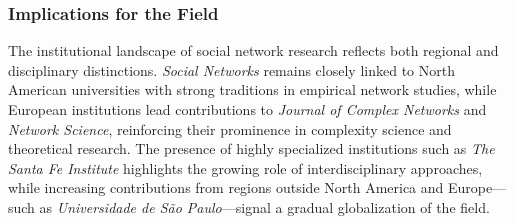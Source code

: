 \documentclass[twocolumn]{article}
\begin{document}
	\subsubsection*{Implications for the Field}
	
	The institutional landscape of social network research reflects both regional and disciplinary distinctions. \textit{Social Networks} remains closely linked to North American universities with strong traditions in empirical network studies, while European institutions lead contributions to \textit{Journal of Complex Networks} and \textit{Network Science}, reinforcing their prominence in complexity science and theoretical research. The presence of highly specialized institutions such as \textit{The Santa Fe Institute} highlights the growing role of interdisciplinary approaches, while increasing contributions from regions outside North America and Europe—such as \textit{Universidade de São Paulo}—signal a gradual globalization of the field.
	
\end{document}
